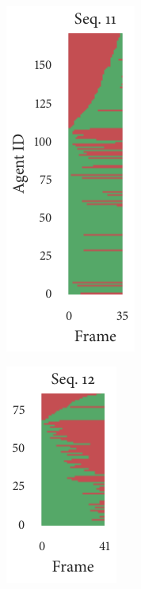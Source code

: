 \begin{figure}[b]
	\begin{subfigure}[b]{0.2\textwidth}
		\centering
		\includegraphics{missingness_sequence11.pdf}
	\end{subfigure}%
	\begin{subfigure}[b]{0.2\textwidth}
		\centering
		\includegraphics{missingness_sequence12.pdf}
	\end{subfigure}%
	\begin{subfigure}[b]{0.2\textwidth}
		\centering

\end{subfigure}
\end{figure}
